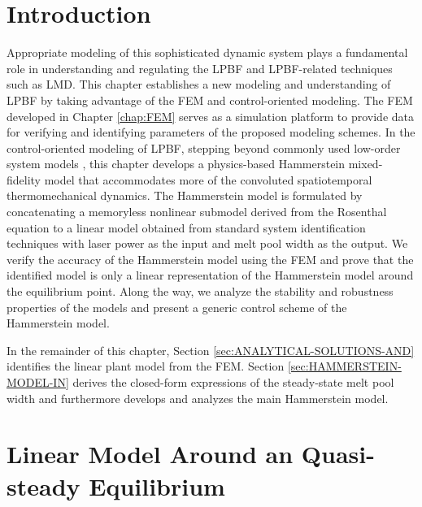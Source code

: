 \documentclass [11pt, proquest] {uwthesis}[2020/02/24]
\begin{document}
\section{Introduction}

Appropriate modeling of this sophisticated
dynamic system plays a fundamental role in understanding and regulating
the LPBF and LPBF-related techniques such as LMD. This chapter establishes a new modeling and understanding of LPBF by
taking advantage of the FEM and control-oriented modeling. The FEM developed in Chapter \ref{chap:FEM} serves as a simulation platform to provide data for verifying and identifying
parameters of the proposed modeling schemes. In the control-oriented
modeling of LPBF, stepping beyond commonly used low-order system models  \cite{kruth2007feedback,craeghs2010feedback,zheng2020distributed,song2011feedback,cao2015control,sammons2014repetitive}, this chapter develops a physics-based Hammerstein mixed-fidelity model that accommodates
more of the convoluted spatiotemporal thermomechanical dynamics. The
Hammerstein model is formulated by concatenating a memoryless nonlinear
submodel derived from the Rosenthal equation to a linear model obtained
from standard system identification techniques with laser power as
the input and melt pool width as the output. We verify the accuracy
of the Hammerstein model using the FEM and prove that the identified
model is only a linear representation of the Hammerstein model around
the equilibrium point. Along the way, we analyze the stability and
robustness properties of the models and present a generic control
scheme of the Hammerstein model.

In the remainder of this chapter, Section \ref{sec:ANALYTICAL-SOLUTIONS-AND}
identifies the linear plant model from the FEM. Section \ref{sec:HAMMERSTEIN-MODEL-IN}
derives the closed-form expressions of the steady-state melt pool
width and furthermore develops and analyzes the main Hammerstein model.

\section{\label{sec:ANALYTICAL-SOLUTIONS-AND}Linear Model Around an Quasi-steady Equilibrium}
\end{document}
